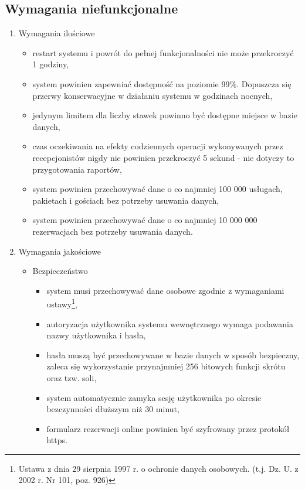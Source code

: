 \documentclass[a4paper,onecolumn,oneside,11pt,wide,floatssmall]{mwrep}
\theoremstyle{definition}
\theoremstyle{plain}%
\theoremstyle{remark}
\begin{document}
\subsection{Wymagania niefunkcjonalne}

\begin{enumerate}
  \item Wymagania ilościowe
    \begin{itemize}
      \item restart systemu i powrót do pełnej funkcjonalności nie może przekroczyć 1 godziny,
      \item system powinien zapewniać dostępność na poziomie 99\%. Dopuszcza się przerwy konserwacyjne w działaniu systemu w godzinach nocnych,
      \item jedynym limitem dla liczby stawek powinno być dostępne miejsce w bazie danych,
      \item czas oczekiwania na efekty codziennych operacji wykonywanych przez recepcjonistów nigdy nie powinien przekroczyć 5 sekund - nie dotyczy to przygotowania raportów,
      \item system powinien przechowywać dane o co najmniej 100 000 usługach, pakietach i gościach bez potrzeby usuwania danych,
      \item system powinien przechowywać dane o co najmniej 10 000 000 rezerwacjach bez potrzeby usuwania danych.
    \end{itemize}
  \item Wymagania jakościowe
    \begin{itemize}
      \item Bezpieczeństwo
        \begin{itemize}
          \item system musi przechowywać dane osobowe zgodnie z wymaganiami ustawy\footnote{Ustawa z dnia 29 sierpnia 1997 r. o ochronie danych osobowych. (t.j. Dz. U. z 2002 r. Nr 101, poz. 926)},
          \item autoryzacja użytkownika systemu wewnętrznego wymaga podawania nazwy użytkownika i hasła,
          \item hasła muszą być przechowywane w bazie danych w sposób bezpieczny, zaleca się wykorzystanie przynajmniej 256 bitowych funkcji skrótu oraz tzw. soli,
          \item system automatycznie zamyka sesję użytkownika po okresie bezczynności dłuższym niż 30 minut,
          \item formularz rezerwacji online powinien być szyfrowany przez protokół https.
        \end{itemize}

\end{itemize}
\end{enumerate}
\end{document}
